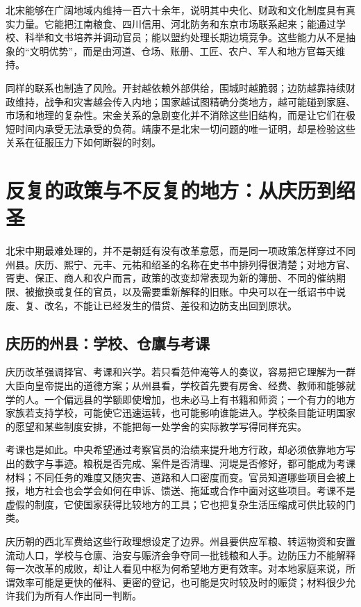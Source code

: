 北宋能够在广阔地域内维持一百六十余年，说明其中央化、财政和文化制度具有真实力量。它能把江南粮食、四川信用、河北防务和东京市场联系起来；能通过学校、科举和文书培养并调动官员；能以盟约处理长期边境竞争。这些能力从不是抽象的“文明优势”，而是由河道、仓场、账册、工匠、农户、军人和地方官每天维持。

同样的联系也制造了风险。开封越依赖外部供给，围城时越脆弱；边防越靠持续财政维持，战争和灾害越会传入内地；国家越试图精确分类地方，越可能碰到家庭、市场和地理的复杂性。宋金关系的急剧变化并不消除这些旧结构，而是让它们在极短时间内承受无法承受的负荷。靖康不是北宋一切问题的唯一证明，却是检验这些关系在征服压力下如何断裂的时刻。

\section{反复的政策与不反复的地方：从庆历到绍圣}

北宋中期最难处理的，并不是朝廷有没有改革意愿，而是同一项政策怎样穿过不同州县。庆历、熙宁、元丰、元祐和绍圣的名称在史书中排列得很清楚；对地方官、胥吏、保正、商人和农户而言，政策的改变却常表现为新的簿册、不同的催纳期限、被撤换或复任的官员，以及需要重新解释的旧账。中央可以在一纸诏书中说废、复、改名，不能让已经发生的借贷、差役和边防支出回到原状。

\subsection{庆历的州县：学校、仓廪与考课}

庆历改革强调择官、考课和兴学。若只看范仲淹等人的奏议，容易把它理解为一群大臣向皇帝提出的道德方案；从州县看，学校首先要有房舍、经费、教师和能够就学的人。一个偏远县的学额即使增加，也未必马上有书籍和师资；一个有力的地方家族若支持学校，可能使它迅速运转，也可能影响谁能进入。学校条目能证明国家的愿望和某些制度安排，不能把每一处学舍的实际教学写得同样充实。

考课也是如此。中央希望通过考察官员的治绩来提升地方行政，却必须依靠地方写出的数字与事迹。粮税是否完成、案件是否清理、河堤是否修好，都可能成为考课材料；不同任务的难度又随灾害、道路和人口密度而变。官员知道哪些项目会被上报，地方社会也会学会如何在申诉、馈送、拖延或合作中面对这些项目。考课不是虚假的制度，它使国家获得比较地方的工具；它也把复杂生活压缩成可供比较的门类。

庆历朝的西北军费给这些行政理想设定了边界。州县要供应军粮、转运物资和安置流动人口，学校与仓廪、治安与赈济会争夺同一批钱粮和人手。边防压力不能解释每一次改革的成败，却让人看见中枢为何希望地方更有效率。对本地家庭来说，所谓效率可能是更快的催科、更密的登记，也可能是灾时较及时的赈贷；材料很少允许我们为所有人作出同一判断。

